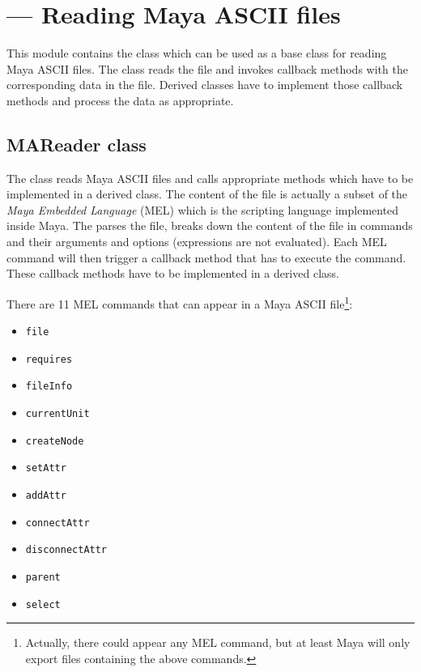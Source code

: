 \section{ ---
        Reading Maya ASCII files}


This module contains the  class which can be used as a
base class for reading Maya ASCII files. The class reads the file
and invokes callback methods with the corresponding data in the
file. Derived classes have to implement those callback methods and
process the data as appropriate.

\subsection{MAReader class}

The  class reads Maya ASCII files and calls
appropriate methods which have to be implemented in a derived class.
The content of the file is actually a subset of the {\em Maya Embedded
Language} (MEL) which is the scripting language implemented inside
Maya.  The  parses the file, breaks down the content
of the file in commands and their arguments and options (expressions
are not evaluated). Each MEL command will then trigger a callback
method that has to execute the command.  These callback methods have
to be implemented in a derived class.

There are 11 MEL commands that can appear in a Maya ASCII 
file\footnote{Actually, there could appear any MEL command, but at least
Maya will only export files containing the above commands.}:

\begin{itemize}
\item {\tt file}
\item {\tt requires}
\item {\tt fileInfo}
\item {\tt currentUnit}
\item {\tt createNode}
\item {\tt setAttr}
\item {\tt addAttr}
\item {\tt connectAttr}
\item {\tt disconnectAttr}
\item {\tt parent}
\item {\tt select}
\end{itemize}


